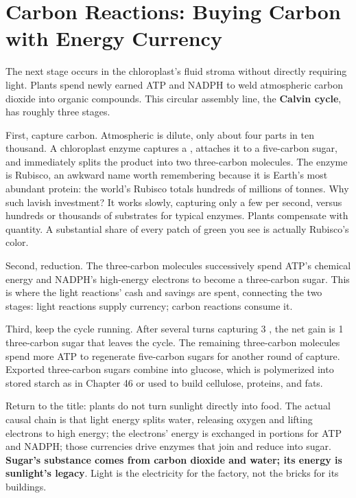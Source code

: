 \section{Carbon Reactions: Buying Carbon with Energy Currency}

The next stage occurs in the chloroplast's fluid stroma without directly requiring light. Plants spend newly earned ATP and NADPH to weld atmospheric carbon dioxide into organic compounds. This circular assembly line, the \textbf{Calvin cycle}, has roughly three stages.

First, capture carbon. Atmospheric  is dilute, only about four parts in ten thousand. A chloroplast enzyme captures a , attaches it to a five-carbon sugar, and immediately splits the product into two three-carbon molecules. The enzyme is Rubisco, an awkward name worth remembering because it is Earth's most abundant protein: the world's Rubisco totals hundreds of millions of tonnes. Why such lavish investment? It works slowly, capturing only a few  per second, versus hundreds or thousands of substrates for typical enzymes. Plants compensate with quantity. A substantial share of every patch of green you see is actually Rubisco's color.

Second, reduction. The three-carbon molecules successively spend ATP's chemical energy and NADPH's high-energy electrons to become a three-carbon sugar. This is where the light reactions' cash and savings are spent, connecting the two stages: light reactions supply currency; carbon reactions consume it.

Third, keep the cycle running. After several turns capturing 3 , the net gain is 1 three-carbon sugar that leaves the cycle. The remaining three-carbon molecules spend more ATP to regenerate five-carbon sugars for another round of capture. Exported three-carbon sugars combine into glucose, which is polymerized into stored starch as in Chapter 46 or used to build cellulose, proteins, and fats.

Return to the title: plants do not turn sunlight directly into food. The actual causal chain is that light energy splits water, releasing oxygen and lifting electrons to high energy; the electrons' energy is exchanged in portions for ATP and NADPH; those currencies drive enzymes that join and reduce  into sugar. \textbf{Sugar's substance comes from carbon dioxide and water; its energy is sunlight's legacy}. Light is the electricity for the factory, not the bricks for its buildings.

